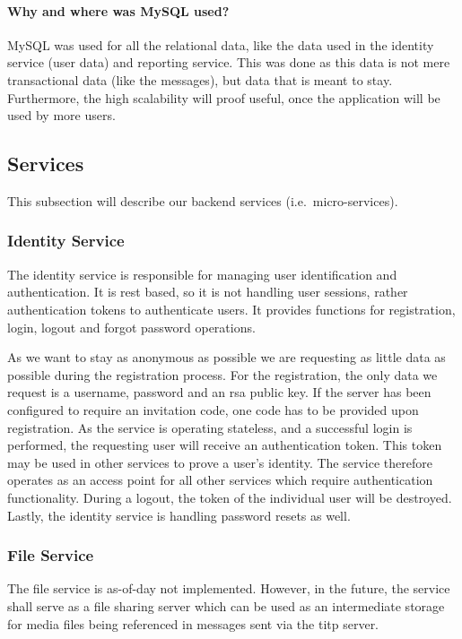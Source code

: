 \paragraph{Why and where was MySQL used?}
MySQL was used for all the relational data, like the data used in the identity service (user data) and reporting
service.
This was done as this data is not mere transactional data (like the messages), but data that is meant to stay.
Furthermore, the high scalability will proof useful, once the application will be used by more users.

\subsection{Services}\label{subsec:services2}

This subsection will describe our backend services (i.e.\ micro-services).

\subsubsection{Identity Service}\label{subsubsec:identitySer}
The identity service is responsible for managing user identification and authentication.
It is \ac{rest} based, so it is not handling user sessions, rather authentication tokens to authenticate users.
It provides functions for registration, login, logout and forgot password operations.

As we want to stay as anonymous as possible we are requesting as little data as possible during the registration
process.
For the registration, the only data we request is a username, password and an \ac{rsa} public key.
If the server has been configured to require an invitation code, one code has to be provided upon registration.
As the service is operating stateless, and a successful login is performed, the requesting user will receive an
authentication token.
This token may be used in other services to prove a user's identity.
The service therefore operates as an access point for all other services which require authentication functionality.
During a logout, the token of the individual user will be destroyed.
Lastly, the identity service is handling password resets as well.

\subsubsection{File Service}
The file service is as-of-day not implemented.
However, in the future, the service shall serve as a file sharing server which can be used as an intermediate storage
for media files being referenced in messages sent via the \ac{titp} server.

